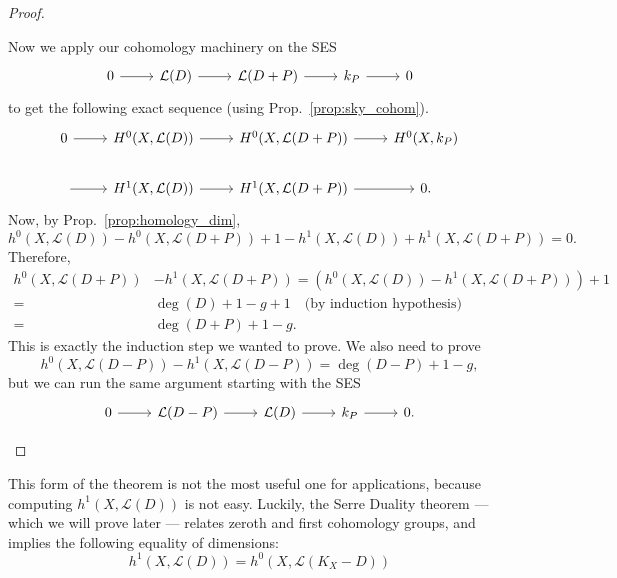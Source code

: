 \begin{proof}
\begin{description}[style=nextline]
          Now we apply our cohomology machinery on the SES
          \[
          \begin{tikzcd}
            0\arrow{r} & \mathcal{L}(D)\arrow{r} & \mathcal{L}(D+P)\arrow{r}
            & k_{P}\arrow{r} & 0
          \end{tikzcd}
          \]
          to get the following exact sequence (using
          Prop.~\ref{prop:sky_cohom}).
          \[
          \begin{tikzcd}
            0\arrow{r} & H^{0}(X, \mathcal{L}(D))\arrow{r}
            & H^{0}(X, \mathcal{L}(D+P))\arrow{r}
            & H^{0}(X, k_{P}) \\
            \arrow{r} & H^{1}(X, \mathcal{L}(D))\arrow{r}
            & H^{1}(X, \mathcal{L}(D+P))\arrow{r} & 0.
          \end{tikzcd}
          \]
          Now, by Prop.~\ref{prop:homology_dim},
          \[
          h^{0}(X,\mathcal{L}(D))-h^{0}(X, \mathcal{L}(D+P))
          +1-h^{1}(X,\mathcal{L}(D))+h^{1}(X,\mathcal{L}(D+P)) = 0.
          \]
          Therefore,
          \begin{align*}
            h^{0}(X,\mathcal{L}(D+P))&-h^{1}(X,\mathcal{L}(D+P))
            =\left(h^{0}(X,\mathcal{L}(D))-h^{1}(X,\mathcal{L}(D+P))\right)
              +1 \\
            =&\deg(D)+1-g+1\quad\text{(by induction hypothesis)} \\
            =&\deg(D+P)+1-g.
          \end{align*}
          This is exactly the induction step we wanted to prove.
          We also need to prove
          \[
            h^{0}(X,\mathcal{L}(D-P))-h^{1}(X,\mathcal{L}(D-P))
            =\deg(D-P)+1-g,
          \]
          but we can run the same argument starting with the SES
          \[
          \begin{tikzcd}
            0\arrow{r} & \mathcal{L}(D-P)\arrow{r} & \mathcal{L}(D)\arrow{r}
            & k_{P}\arrow{r} & 0.
          \end{tikzcd}
          \]
  \end{description}
\end{proof}

This form of the theorem is not the most useful one for applications,
because computing $h^{1}(X,\mathcal{L}(D))$ is not easy. Luckily, the Serre
Duality theorem --- which we will prove later --- relates zeroth and first
cohomology groups, and implies the following equality of dimensions:
\[h^{1}(X,\mathcal{L}(D))=h^{0}(X,\mathcal{L}(K_{X}-D))\]


